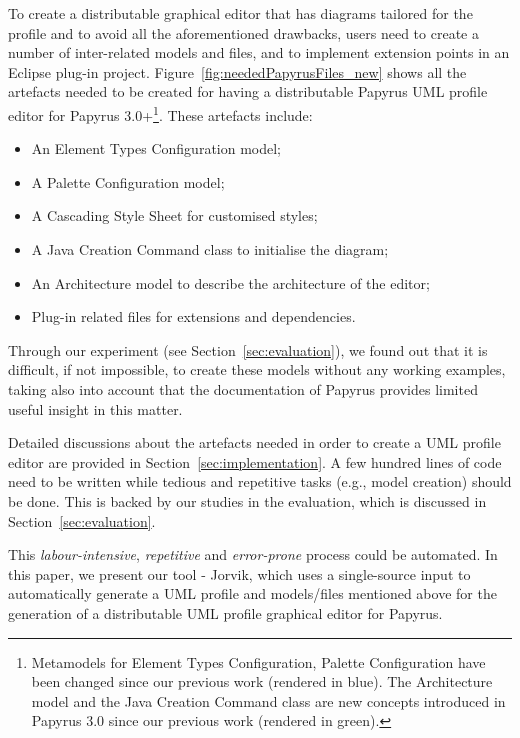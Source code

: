 To create a distributable graphical editor that has diagrams tailored for the profile and to avoid all the aforementioned drawbacks, users need to create a number of inter-related models and files, and to implement extension points in an Eclipse plug-in project. 
Figure~\ref{fig:neededPapyrusFiles_new} shows all the artefacts needed to be created for having a distributable Papyrus UML profile editor for Papyrus 3.0+\footnote{Metamodels for Element Types Configuration, Palette Configuration have been changed since our previous work (rendered in blue). 
	The Architecture model and the Java Creation Command class are new concepts introduced in Papyrus 3.0 since our previous work (rendered in green).}.
These artefacts include:
\begin{itemize}
	\item An Element Types Configuration model;
	\item A Palette Configuration model;
	\item A Cascading Style Sheet for customised styles;
	\item A Java Creation Command class to initialise the diagram;
	\item An Architecture model to describe the architecture of the editor;
	\item Plug-in related files for extensions and dependencies.
\end{itemize}


Through our experiment (see Section~\ref{sec:evaluation}), we found out that it is difficult, if not impossible, to create these models without any working examples, taking also into account that the documentation of Papyrus provides limited useful insight in this matter.

Detailed discussions about the artefacts needed in order to create a UML profile editor are provided in Section~\ref{sec:implementation}.
A few hundred lines of code need to be written while tedious and repetitive tasks (e.g., model creation) should be done. 
This is backed by our studies in the evaluation, which is discussed in Section~\ref{sec:evaluation}.

This \textit{labour-intensive}, \textit{repetitive} and \textit{error-prone} process could be automated. 
In this paper, we present our tool - Jorvik, which uses a single-source input to automatically generate a UML profile and models/files mentioned above for the generation of a distributable UML profile graphical editor for Papyrus. 
